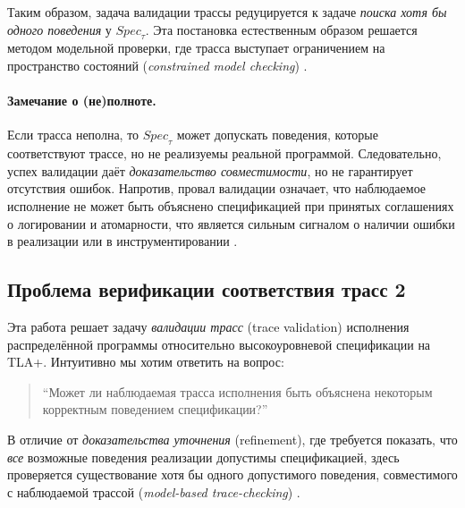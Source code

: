 Таким образом, задача валидации трассы редуцируется к задаче
\emph{поиска хотя бы одного поведения} у $\mathit{Spec}_\tau$.
Эта постановка естественным образом решается методом модельной проверки,
где трасса выступает ограничением на пространство состояний
(\emph{constrained model checking}) \cite{CirsteaKuppeLoillierMerz2024,HowardTraceChecking2011}.

\paragraph{Замечание о (не)полноте.}
Если трасса неполна, то $\mathit{Spec}_\tau$ может допускать поведения,
которые соответствуют трассе, но не реализуемы реальной программой.
Следовательно, успех валидации даёт \emph{доказательство совместимости},
но не гарантирует отсутствия ошибок. Напротив, провал валидации означает,
что наблюдаемое исполнение не может быть объяснено спецификацией при
принятых соглашениях о логировании и атомарности, что является сильным
сигналом о наличии ошибки в реализации или в инструментировании
\cite{CirsteaKuppeLoillierMerz2024}.

\subsection{Проблема верификации соответствия трасс 2}

Эта работа решает задачу \emph{валидации трасс} (trace validation) исполнения
распределённой программы относительно высокоуровневой спецификации на TLA+.
Интуитивно мы хотим ответить на вопрос:

\begin{quote}
``Может ли наблюдаемая трасса исполнения быть объяснена некоторым корректным
поведением спецификации?''
\end{quote}

В отличие от \emph{доказательства уточнения} (refinement), где требуется показать,
что \emph{все} возможные поведения реализации допустимы спецификацией,
здесь проверяется существование хотя бы одного допустимого поведения,
совместимого с наблюдаемой трассой
(\emph{model-based trace-checking}) \cite{HowardTraceChecking2011,CirsteaKuppeLoillierMerz2024}.

